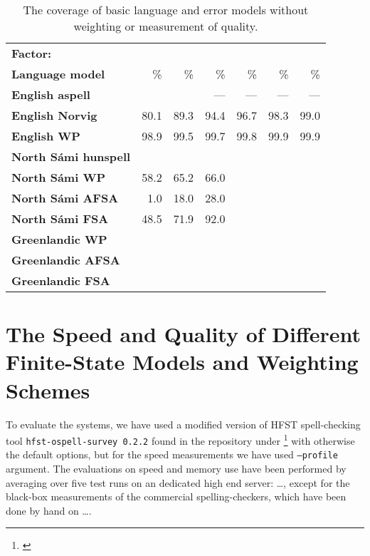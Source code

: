 \documentclass[a4paper,12pt]{article}
\begin{document}
\begin{table}
    \centering
    \begin{tabular}{|l|r|r|r||r|r|r|}
        \hline
        \bf Factor: & \bf \\
        \bf Language model &  \% & \% & \% & \% & \% & \% \\
        \hline
        \bf English aspell &      &      & ---  & ---  & ---  & ---  \\
        \bf English Norvig & 80.1 & 89.3 & 94.4 & 96.7 & 98.3 & 99.0 \\
            \bf English WP & 98.9 & 99.5 & 99.7 & 99.8 & 99.9 & 99.9 \\
        \hline
        \bf North Sámi hunspell & & & & & & \\
        \bf North Sámi WP & 58.2 & 65.2 & 66.0 & & & \\
               \bf North Sámi AFSA & 1.0 & 18.0 & 28.0 & & & \\
               \bf North Sámi FSA & 48.5 & 71.9 & 92.0 & & & \\
        \hline
        \bf Greenlandic WP & & & & & & \\
                 \bf Greenlandic AFSA & & & & & & \\
                  \bf Greenlandic FSA & & & & & & \\
        \hline
    \end{tabular}
    \caption{The coverage of basic language and error models without weighting
        or measurement of quality.\label{table:baseline-coverage}}
\end{table}


\section{The Speed and Quality of Different Finite-State Models and Weighting
Schemes}
\label{sec:evaluation}

To evaluate the systems, we have used a modified version of HFST spell-checking
tool \texttt{hfst-ospell-survey 0.2.2} found in the repository under
\footnote{\url{}} with otherwise the default
options, but for the speed measurements we have used \texttt{--profile} argument.
The evaluations on speed and memory use have been performed by averaging over
five test runs on an dedicated high end server: \ldots, except for the
black-box measurements of the commercial spelling-checkers, which have been done by
hand on \ldots.
\end{document}
